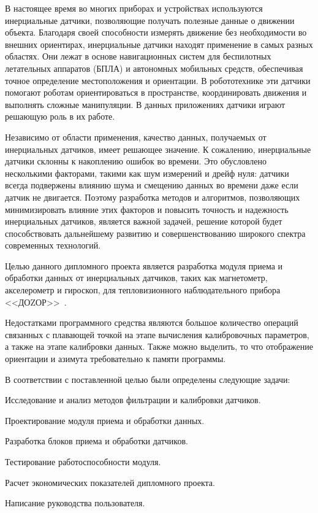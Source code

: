 \label{sec:intro}

В настоящее время во многих приборах и устройствах используются инерциальные датчики, 
позволяющие получать полезные данные о движении объекта.
Благодаря своей способности измерять движение без необходимости во внешних ориентирах, 
инерциальные датчики находят применение в самых разных областях. Они лежат в основе навигационных 
систем для беспилотных летательных аппаратов (БПЛА) и автономных мобильных средств, обеспечивая 
точное определение местоположения и ориентации. В робототехнике эти датчики помогают роботам 
ориентироваться в пространстве, координировать движения и выполнять сложные манипуляции.
В данных приложениях датчики играют решающую роль в их работе.

Независимо от области применения, качество данных, получаемых от инерциальных датчиков, имеет решающее значение.
К сожалению, инерциальные датчики склонны к накоплению ошибок во времени. Это обусловлено несколькими факторами, 
такими как шум измерений и дрейф нуля: датчики всегда подвержены влиянию шума и смещению данных во времени даже если датчик не двигается.
Поэтому разработка методов и алгоритмов, позволяющих минимизировать влияние этих факторов и повысить точность и надежность инерциальных датчиков,
является важной задачей, решение которой будет способствовать дальнейшему развитию и совершенствованию широкого спектра современных технологий.

Целью данного дипломного проекта является разработка модуля приема и обработки данных от инерциальных датчиков,
таких как магнетометр, акселерометр и гироскоп, для тепловизионного наблюдательного прибора <<ДОZОР>>~.

Недостатками программного средства являются большое количество операций связанных с плавающей точкой на этапе вычисления калибровочных параметров,
а также на этапе калибровки данных. Также можно выделить, то что отображение ориентации и азимута требовательно к памяти программы.   

В соответствии с поставленной целью были определены следующие задачи:
\begin{enumerate_num}
    \item Исследование и анализ методов фильтрации и калибровки датчиков.
    \item Проектирование модуля приема и обработки данных.
    \item Разработка блоков приема и обработки датчиков.
    \item Тестирование работоспособности модуля.
    \item Расчет экономических показателей дипломного проекта.
    \item Написание руководства пользователя.
\end{enumerate_num}
